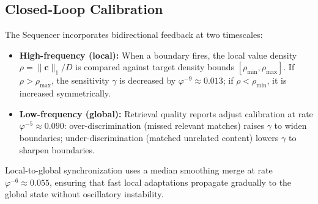 \subsection{Closed-Loop Calibration}
\label{sec:calibration}

The Sequencer incorporates bidirectional feedback at two timescales:

\begin{itemize}[nosep]
  \item \textbf{High-frequency (local):}  When a boundary fires, the local
        value density $\rho = \|\mathbf{c}\|_1 / D$ is compared against
        target density bounds $[\rho_{\min}, \rho_{\max}]$.  If $\rho >
        \rho_{\max}$, the sensitivity $\gamma$ is decreased by
        $\varphi^{-9} \approx 0.013$; if $\rho < \rho_{\min}$, it is
        increased symmetrically.
  \item \textbf{Low-frequency (global):}  Retrieval quality
        reports adjust calibration at rate $\varphi^{-5} \approx 0.090$:
        over-discrimination (missed relevant matches) raises $\gamma$ to
        widen boundaries; under-discrimination (matched unrelated content)
        lowers $\gamma$ to sharpen boundaries.
\end{itemize}

\noindent Local-to-global synchronization uses a median smoothing merge
at rate $\varphi^{-6} \approx 0.055$, ensuring that fast local adaptations
propagate gradually to the global state without oscillatory instability.
